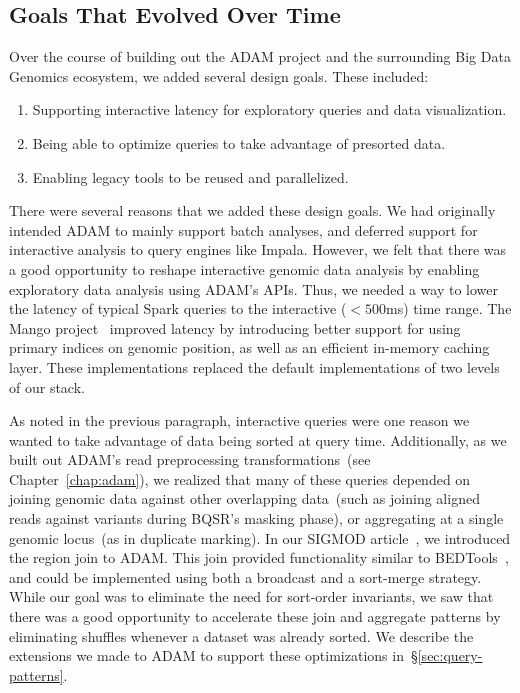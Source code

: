 \documentclass[phd]{ucbthesis}
\begin{document}
\subsection{Goals That Evolved Over Time}
\label{sec:evolved-goals}

Over the course of building out the {ADAM} project and the surrounding
{Big Data Genomics} ecosystem, we added several design goals. These
included:

\begin{enumerate}
\item Supporting interactive latency for exploratory queries and data
  visualization.
\item Being able to optimize queries to take advantage of presorted data.
\item Enabling legacy tools to be reused and parallelized.
\end{enumerate}

There were several reasons that we added these design goals. We had
originally intended {ADAM} to mainly support batch analyses, and deferred
support for interactive analysis to query engines like {Impala}. However,
we felt that there was a good opportunity to reshape interactive genomic data
analysis by enabling exploratory data analysis using {ADAM}'s APIs.
Thus, we needed a way to lower the latency of typical {Spark} queries to the
interactive ($<500$ms) time range.
The {Mango} project~\cite{tu16, morrow17} improved latency by introducing
better support for using primary indices on genomic position, as well as an
efficient in-memory caching layer. These implementations replaced the default
implementations of two levels of our stack.

As noted in the previous paragraph, interactive queries were one reason we wanted
to take advantage of data being sorted at query time. Additionally, as we built
out {ADAM}'s read preprocessing transformations~(see
Chapter~\ref{chap:adam}), we realized that many of these queries depended on
joining genomic data against other overlapping data~(such as joining aligned
reads against variants during BQSR's masking phase), or aggregating at a single
genomic locus~(as in duplicate marking). In our SIGMOD article~\cite{nothaft15},
we introduced the region join to {ADAM}. This join provided functionality
similar to {BEDTools}~\cite{quinlan10}, and could be implemented using
both a broadcast and a sort-merge strategy. While our goal was to eliminate the
need for sort-order invariants, we saw that there was a good opportunity to
accelerate these join and aggregate patterns by eliminating shuffles whenever
a dataset was already sorted. We describe the extensions we made to
{ADAM} to support these optimizations in~\S\ref{sec:query-patterns}.
\end{document}
